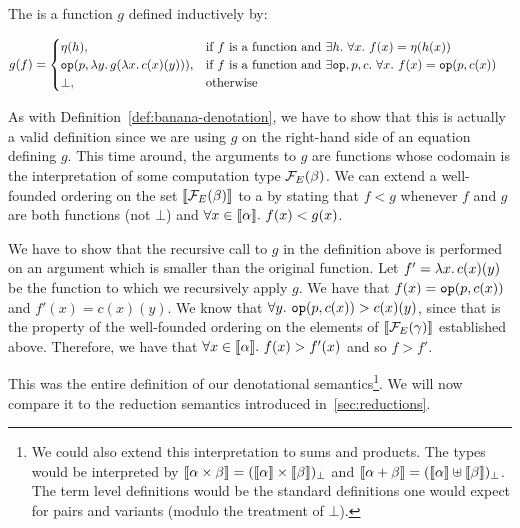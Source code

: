 \begin{definition}
  The  is a function $g$
  defined inductively by:
  
  \begin{align*}
    g(f) &= \begin{cases}
      \eta(h), & \text{if $f$ is a function and $\exists h.\ \forall x.\ f(x) = \eta(h(x))$} \\
      \mathtt{op}(p, \lambda y.\, g(\lambda x.\, c(x)(y))), & \text{if $f$ is a function and $\exists \mathtt{op},p,c.\ \forall x.\ f(x) = \mathtt{op}(p, c(x))$} \\
      \bot, & \text{otherwise} \\
    \end{cases}
  \end{align*}
  
  As with Definition~\ref{def:banana-denotation}, we have to show that this
  is actually a valid definition since we are using $g$ on the right-hand
  side of an equation defining $g$. This time around, the arguments to $g$
  are functions whose codomain is the interpretation of some computation
  type $\mathcal{F}_E(\beta)$. We can extend a well-founded ordering on the set
  $\llbracket \mathcal{F}_E(\beta) \rrbracket$ to a  by stating that $f < g$ whenever $f$
  and $g$ are both functions (not $\bot$) and
  $\forall x \in \llbracket \alpha \rrbracket.\ f(x) < g(x)$.
  
  We have to show that the recursive call to $g$ in the definition above is
  performed on an argument which is smaller than the original function. Let
  $f' = \lambda x.\, c(x)(y)$ be the function to which we recursively apply
  $g$. We have that $f(x) = \mathtt{op}(p, c(x))$ and $f'(x) = c(x)(y)$. We
  know that $\forall y.\ \mathtt{op}(p, c(x)) > c(x)(y)$, since that is the
  property of the well-founded ordering on the elements of
  $\llbracket \mathcal{F}_E(\gamma) \rrbracket$ established above. Therefore, we have that
  $\forall x \in \llbracket \alpha \rrbracket.\ f(x) > f'(x)$ and so $f > f'$.
\end{definition}

This was the entire definition of our denotational semantics\footnote{We
  could also extend this interpretation to sums and products. The types
  would be interpreted by
  $\llbracket \alpha \times \beta \rrbracket = (\llbracket \alpha \rrbracket \times \llbracket \beta \rrbracket)_\bot$ and
  $\llbracket \alpha + \beta \rrbracket = (\llbracket \alpha \rrbracket \uplus \llbracket \beta \rrbracket)_\bot$. The term
  level definitions would be the standard definitions one would expect for
  pairs and variants (modulo the treatment of $\bot$).}. We will now
compare it to the reduction semantics introduced in~\ref{sec:reductions}.


